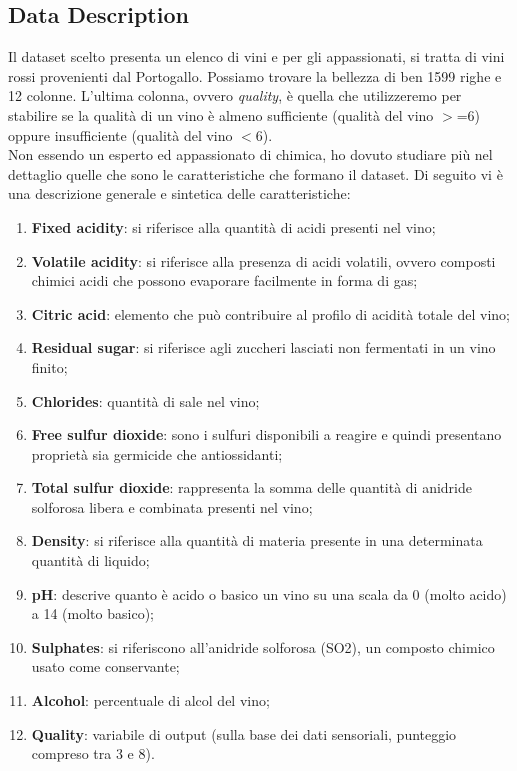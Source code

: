 \documentclass{article}
\begin{document}
\begin{titlepage}
         \subsection{Data Description}
         Il dataset scelto presenta un elenco di vini e per gli appassionati, si tratta di vini rossi provenienti dal Portogallo. Possiamo trovare la bellezza di ben 1599 righe e 12 colonne. L'ultima colonna, ovvero \textit{quality}, è quella che utilizzeremo per stabilire se la qualità di un vino è almeno sufficiente (qualità del vino \( > \)=6) oppure insufficiente (qualità del vino \( < \)6). \\
         Non essendo un esperto ed appassionato di chimica, ho dovuto studiare più nel dettaglio quelle che sono le caratteristiche che formano il dataset. Di seguito vi è una descrizione generale e sintetica delle caratteristiche:
         \begin{enumerate}
            \item \textbf{Fixed acidity}: si riferisce alla quantità di acidi presenti nel vino;
            \item \textbf{Volatile acidity}: si riferisce alla presenza di acidi volatili, ovvero composti chimici acidi che possono evaporare facilmente in forma di gas;
            \item \textbf{Citric acid}: elemento che può contribuire al profilo di acidità totale del vino;
            \item \textbf{Residual sugar}: si riferisce agli zuccheri lasciati non fermentati in un vino finito;
            \item \textbf{Chlorides}: quantità di sale nel vino;
            \item \textbf{Free sulfur dioxide}: sono i sulfuri disponibili a reagire e quindi presentano proprietà sia germicide che antiossidanti;
            \item \textbf{Total sulfur dioxide}: rappresenta la somma delle quantità di anidride solforosa libera e combinata presenti nel vino;
            \item \textbf{Density}: si riferisce alla quantità di materia presente in una determinata quantità di liquido;
            \item \textbf{pH}: descrive quanto è acido o basico un vino su una scala da 0 (molto acido) a 14 (molto basico);
            \item \textbf{Sulphates}: si riferiscono all'anidride solforosa (SO2), un composto chimico usato come conservante;
            \item \textbf{Alcohol}: percentuale di alcol del vino;
            \item \textbf{Quality}: variabile di output (sulla base dei dati sensoriali, punteggio compreso tra 3 e 8). 
         \end{enumerate}


\end{titlepage}
\end{document}
